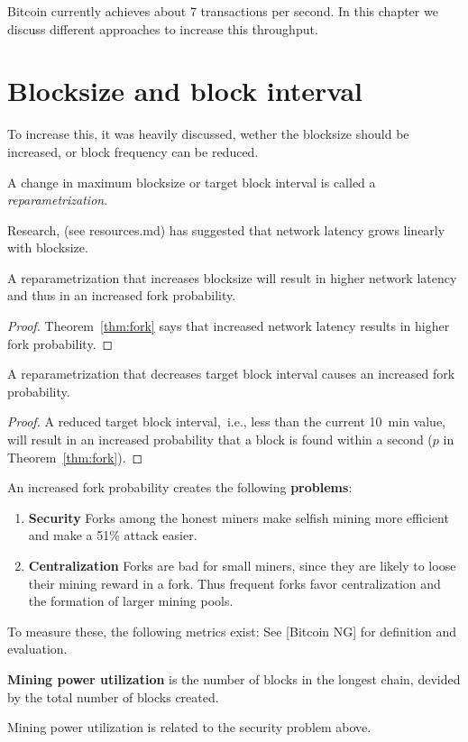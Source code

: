 
Bitcoin currently achieves about 7 transactions per second. 
In this chapter we discuss different approaches to increase this throughput.

\section{Blocksize and block interval}
To increase this, it was heavily discussed, wether the blocksize should be increased, or block frequency can be reduced.

\begin{definition} A change in maximum blocksize or target block interval is called a \emph{reparametrization}.
\end{definition}

Research, (see resources.md) has suggested that network latency grows linearly with blocksize.
\begin{lem} 
	A reparametrization that increases blocksize will result in higher network latency and thus in an increased fork probability.
\end{lem}
\begin{proof}
Theorem~\ref{thm:fork} says that increased network latency results in higher fork probability.	
\end{proof}

\begin{lem}
	A reparametrization that decreases target block interval causes an increased fork probability.
\end{lem}
\begin{proof}
A reduced target block interval,~i.e., less than the current 10~min value, will result in an increased probability that a block is found within a second ($p$ in Theorem~\ref{thm:fork}).
\end{proof}

An increased fork probability creates the following \textbf{problems}:
\begin{enumerate}
	\item \textbf{Security} Forks among the honest miners make selfish mining more efficient and make a 51\% attack easier. 
	\item \textbf{Centralization} Forks are bad for small miners, since they are likely to loose their mining reward in a fork. Thus frequent forks favor centralization and the formation of larger mining pools.
\end{enumerate}

To measure these, the following metrics exist: See [Bitcoin NG] for definition and evaluation.
\begin{definition}
\textbf{Mining power utilization} is the number of blocks in the longest chain, devided by the total number of blocks created. 
\end{definition}
Mining power utilization is related to the security problem above.


